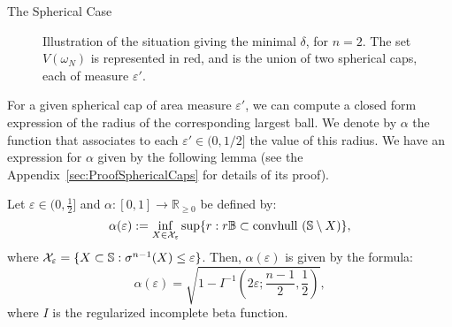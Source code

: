 \begin{subsection}{The Spherical Case}
\begin{figure}[H]
\begin{center}
\end{center}
\caption{Illustration of the situation giving the minimal $\delta$, for $n=2$. The set $V(\omega_N)$ is represented in red, and is the union of two spherical caps, each of measure $\varepsilon'$.}
\end{figure}


For a given spherical cap of area measure $\varepsilon'$, we can compute a closed form expression of the radius of the corresponding largest ball. We denote by $\alpha$ the function that associates to each $\varepsilon' \in (0,1/2]$ the value of this radius. We have an expression for $\alpha$ given by the following lemma (see the Appendix~\ref{sec:ProofSphericalCaps} for details of its proof).

\begin{lem}\label{lemma:propositionSphericalCaps}
Let $\varepsilon \in (0, \frac{1}{2}]$ and $\alpha: [0,1] \to \mathbb{R}_{\geq 0}$ be defined by:
\begin{equation}\label{eqn:ballinc}
\alpha(\varepsilon) := \inf_{X \in \mathcal{X}_{\varepsilon}} \sup\{r: r\mathbb{B} \subset \mbox{convhull }(\mathbb{S} \setminus X)\},
\end{equation}
where $\mathcal{X}_{\varepsilon} = \{ X \subset \mathbb{S}: \sigma^{n-1}(X) \leq \varepsilon \}$. Then, $\alpha(\varepsilon)$ is given by the formula:
\begin{equation}\label{eqn:alphaEpsilon}
\alpha(\varepsilon) = \sqrt{1- I^{-1} \left( 2\varepsilon; \frac{n-1}{2}, \frac{1}{2} \right)}, 
\end{equation}
where $I$ is the regularized incomplete beta function.
\end{lem}


\end{subsection}
